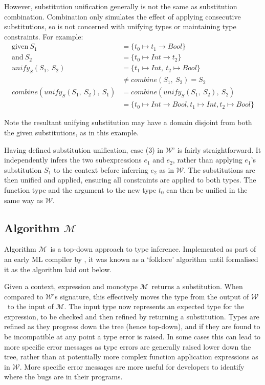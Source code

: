 \documentclass[a4paper,fleqn,oneside,12pt]{report}
\newcommand{\W}{$\mathcal{W}$}
\newcommand{\M}{$\mathcal{M}$}
\begin{document}
However, substitution unification generally is not the same as substitution combination. Combination only simulates the effect of applying consecutive substitutions, so is not concerned with unifying types or maintaining type constraints. For example:
\begin{align*}
  \mathrm{given}\ S_1                        & = \{ t_0 \mapsto t_1 \rightarrow Bool \}\\
  \mathrm{and}\ S_2                          & = \{ t_0 \mapsto Int \rightarrow t_2 \}\\[0.25cm]
  \mathit{unify_S}(S_1,\ S_2)                & = \{ t_1 \mapsto Int,\ t_2 \mapsto Bool \}\\
                                             & \neq \mathit{combine}(S_1,\ S_2) = S_2\\[0.25cm]
  combine(\mathit{unify_S}(S_1,\ S_2),\ S_1) & = combine(\mathit{unify_S}(S_1,\ S_2),\ S_2)\\
                                             & = \{ t_0 \mapsto Int \rightarrow Bool, t_1 \mapsto Int, t_2 \mapsto Bool \}
\end{align*}

Note the resultant unifying substitution may have a domain disjoint from both the given substitutions, as in this example.

Having defined substitution unification, case (3) in \W' is fairly straightforward. It independently infers the two subexpressions $e_1$ and $e_2$, rather than applying $e_1$'s substitution $S_1$ to the context before inferring $e_2$ as in \W. The substitutions are then unified and applied, ensuring all constraints are applied to both types. The function type and the argument to the new type $t_0$ can then be unified in the same way as \W.

\subsection{Algorithm \texorpdfstring{\M}{M}}

Algorithm \M\ is a top-down approach to type inference. Implemented as part of an early ML compiler by \cite{ref32}, it was known as a `folklore' algorithm until \cite{ref27} formalised it as the algorithm laid out below.

Given a context, expression and monotype \M\ returns a substitution. When compared to \W's signature, this effectively moves the type from the output of \W\ to the input of \M. The input type now represents an expected type for the expression, to be checked and then refined by returning a substitution. Types are refined as they progress down the tree (hence top-down), and if they are found to be incompatible at any point a type error is raised. In some cases this can lead to more specific error messages as type errors are generally raised lower down the tree, rather than at potentially more complex function application expressions as in \W. More specific error messages are more useful for developers to identify where the bugs are in their programs.
\end{document}
